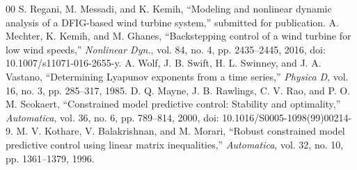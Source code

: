\documentclass[conference]{IEEEtran}
\begin{document}
\begin{thebibliography}{00}
 S. Regani, M. Messadi, and K. Kemih, ``Modeling and nonlinear dynamic analysis of a DFIG-based wind turbine system,'' submitted for publication.
 A. Mechter, K. Kemih, and M. Ghanes, ``Backstepping control of a wind turbine for low wind speeds,'' \textit{Nonlinear Dyn.}, vol. 84, no. 4, pp. 2435--2445, 2016, doi: 10.1007/s11071-016-2655-y.
 A. Wolf, J. B. Swift, H. L. Swinney, and J. A. Vastano, ``Determining Lyapunov exponents from a time series,'' \textit{Physica D}, vol. 16, no. 3, pp. 285--317, 1985.
 D. Q. Mayne, J. B. Rawlings, C. V. Rao, and P. O. M. Scokaert, ``Constrained model predictive control: Stability and optimality,'' \textit{Automatica}, vol. 36, no. 6, pp. 789--814, 2000, doi: 10.1016/S0005-1098(99)00214-9.
 M. V. Kothare, V. Balakrishnan, and M. Morari, ``Robust constrained model predictive control using linear matrix inequalities,'' \textit{Automatica}, vol. 32, no. 10, pp. 1361--1379, 1996.
\end{thebibliography}
\end{document}
